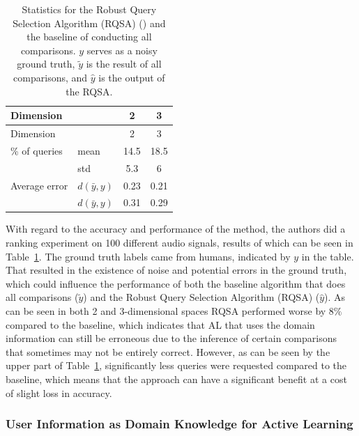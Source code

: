 \documentclass[
  letterpaper,
  numbers=noenddot,
  DIV=11]{scrreprt}
\theoremstyle{plain}
\theoremstyle{definition}
\theoremstyle{remark}
\begin{document}
\begin{longtable}[]{@{}llcc@{}}
\caption{Statistics for the Robust Query Selection Algorithm (RQSA)
() and the baseline of
conducting all comparisons. \(y\) serves as a noisy ground truth,
\(\tilde{y}\) is the result of all comparisons, and \(\hat{y}\) is the
output of the RQSA.}\label{tbl-geo_acc}\tabularnewline
\toprule\noalign{}
Dimension & & 2 & 3 \\
\midrule\noalign{}
\endfirsthead
\toprule\noalign{}
Dimension & & 2 & 3 \\
\midrule\noalign{}
\endhead
\bottomrule\noalign{}
\endlastfoot
\% of queries & mean & 14.5 & 18.5 \\
& std & 5.3 & 6 \\
Average error & \(d(\bar{y}, y)\) & 0.23 & 0.21 \\
& \(d(\bar{y}, y)\) & 0.31 & 0.29 \\
\end{longtable}

With regard to the accuracy and performance of the method, the authors
did a ranking experiment on 100 different audio signals, results of
which can be seen in Table~\ref{tbl-geo_acc}. The ground truth labels
came from humans, indicated by \(y\) in the table. That resulted in the
existence of noise and potential errors in the ground truth, which could
influence the performance of both the baseline algorithm that does all
comparisons (\(\tilde{y}\)) and the Robust Query Selection Algorithm
(RQSA) (\(\hat{y}\)). As can be seen in both 2 and 3-dimensional spaces
RQSA performed worse by \(8\%\) compared to the baseline, which
indicates that AL that uses the domain information can still be
erroneous due to the inference of certain comparisons that sometimes may
not be entirely correct. However, as can be seen by the upper part of
Table~\ref{tbl-geo_acc}, significantly less queries were requested
compared to the baseline, which means that the approach can have a
significant benefit at a cost of slight loss in accuracy.

\subsubsection*{User Information as Domain Knowledge for Active
Learning}\label{sec-geo_app}
\end{document}
